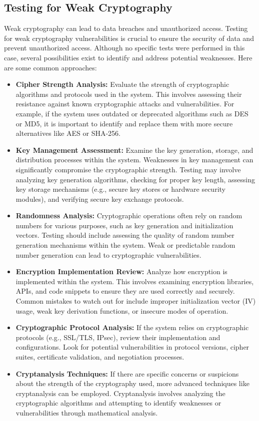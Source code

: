 \documentclass[12pt]{article}
\begin{document}
\newpage

\subsection{Testing for Weak Cryptography}
Weak cryptography can lead to data breaches and unauthorized access. Testing for weak cryptography vulnerabilities is crucial to ensure the security of data and prevent unauthorized access. Although no specific tests were performed in this case, several possibilities exist to identify and address potential weaknesses. Here are some common approaches:
\begin{itemize}
\item \textbf{Cipher Strength Analysis:} Evaluate the strength of cryptographic algorithms and protocols used in the system. This involves assessing their resistance against known cryptographic attacks and vulnerabilities. For example, if the system uses outdated or deprecated algorithms such as DES or MD5, it is important to identify and replace them with more secure alternatives like AES or SHA-256.

\item \textbf{Key Management Assessment:} Examine the key generation, storage, and distribution processes within the system. Weaknesses in key management can significantly compromise the cryptographic strength. Testing may involve analyzing key generation algorithms, checking for proper key length, assessing key storage mechanisms (e.g., secure key stores or hardware security modules), and verifying secure key exchange protocols.

\item \textbf{Randomness Analysis:} Cryptographic operations often rely on random numbers for various purposes, such as key generation and initialization vectors. Testing should include assessing the quality of random number generation mechanisms within the system. Weak or predictable random number generation can lead to cryptographic vulnerabilities.

\item \textbf{Encryption Implementation Review:} Analyze how encryption is implemented within the system. This involves examining encryption libraries, APIs, and code snippets to ensure they are used correctly and securely. Common mistakes to watch out for include improper initialization vector (IV) usage, weak key derivation functions, or insecure modes of operation.

\item \textbf{Cryptographic Protocol Analysis:} If the system relies on cryptographic protocols (e.g., SSL/TLS, IPsec), review their implementation and configurations. Look for potential vulnerabilities in protocol versions, cipher suites, certificate validation, and negotiation processes.

\item \textbf{Cryptanalysis Techniques:} If there are specific concerns or suspicions about the strength of the cryptography used, more advanced techniques like cryptanalysis can be employed. Cryptanalysis involves analyzing the cryptographic algorithms and attempting to identify weaknesses or vulnerabilities through mathematical analysis.
\end{itemize}
\end{document}
